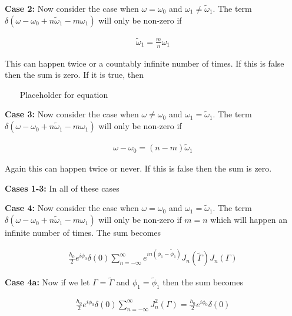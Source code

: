 \documentclass[onecolumn, groupedaddress, 10pt]{revtex4-1}
\begin{document}
\textbf{Case 2:}  Now consider the case when $\omega = \omega_0$ and $\omega_1 \neq \widetilde{\omega}_1$.  The term $\delta(\omega - \omega_0 + n\widetilde{\omega}_1 - m\omega_1)$ will only be non-zero if

\begin{align}
\widetilde{\omega}_1 = \frac{m}{n} \omega_1
\end{align}

This can happen twice or a countably infinite number of times.  If this is false then the sum is zero.  If it is true, then


~~~ Placeholder for equation ~~~


\textbf{Case 3:}  Now consider the case when $\omega \neq \omega_0$ and $\omega_1 = \widetilde{\omega}_1$.  The term $\delta(\omega - \omega_0 + n\widetilde{\omega}_1 - m\omega_1)$ will only be non-zero if

\begin{align}
\omega - \omega_0 = (n-m)\widetilde{\omega}_1
\end{align}

Again this can happen twice or never.  If this is false then the sum is zero.


\textbf{Cases 1-3:}  In all of these cases

\textbf{Case 4:}  Now consider the case when $\omega = \omega_0$ and $\omega_1 = \widetilde{\omega}_1$.  The term $\delta(\omega - \omega_0 + n\widetilde{\omega}_1 - m\omega_1)$ will only be non-zero if $m=n$ which will happen an infinite number of times.  The sum becomes

\begin{align}
\frac{h_0}{2} e^{i\phi_0} \delta(0) \sum_{n=-\infty}^{\infty} e^{in(\phi_1-\widetilde{\phi}_1)} J_n(\widetilde{\Gamma}) J_n (\Gamma)
\end{align}

\textbf{Case 4a:} Now if we let $\Gamma = \widetilde{\Gamma}$ and $\phi_1 = \widetilde{\phi}_1$ then the sum becomes

\begin{align}
\frac{h_0}{2} e^{i\phi_0} \delta(0) \sum_{n=-\infty}^{\infty} J_n^2 (\Gamma) = \frac{h_0}{2} e^{i\phi_0} \delta(0)
\end{align}
\end{document}
